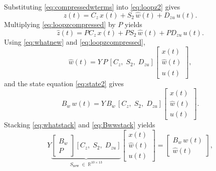 \documentclass[11pt]{article}
\newcommand{\R}{\mathbb{R}}
\begin{document}
Substituting \eqref{eq:compressedwterms} into \eqref{eq:loopz2} gives
\begin{equation}
    z(t) = C_z\, x(t) + S_2\, \hat{w}(t) + D_{zu}\, u(t).
    \label{eq:loopzcompressed}
\end{equation}
Multiplying \eqref{eq:loopzcompressed} by $P$ yields
\begin{equation}
    \hat{z}(t) = P C_z\, x(t) + P S_2\, \hat{w}(t) + P D_{zu}\, u(t).
    \label{eq:zhatloop}
\end{equation}
Using \eqref{eq:whatnew} and \eqref{eq:loopzcompressed},
\begin{equation}
    \hat{w}(t)
    = Y\, P\,[C_z,\; S_2,\; D_{zu}]
      \begin{bmatrix}
          x(t) \\ \hat{w}(t) \\ u(t)
      \end{bmatrix},
    \label{eq:whatstack}
\end{equation}
and the state equation \eqref{eq:state2} gives
\begin{equation}
    B_w\, w(t)
    = Y\, B_w\,[C_z,\; S_2,\; D_{zu}]
      \begin{bmatrix}
          x(t) \\ \hat{w}(t) \\ u(t)
      \end{bmatrix}.
    \label{eq:Bwwstack}
\end{equation}
Stacking \eqref{eq:whatstack} and \eqref{eq:Bwwstack} yields
\begin{equation}
    Y \underbrace{
        \begin{bmatrix}
            B_w \\[2pt] P
        \end{bmatrix}
        [C_z,\; S_2,\; D_{zu}]
    }_{S_{\mathrm{new}}\;\in\;\R^{10\times 13}}
    \begin{bmatrix}
        x(t) \\ \hat{w}(t) \\ u(t)
    \end{bmatrix}
    =
    \begin{bmatrix}
        B_w\, w(t) \\ \hat{w}(t)
    \end{bmatrix},
    \label{eq:Snew}
\end{equation}
\end{document}
